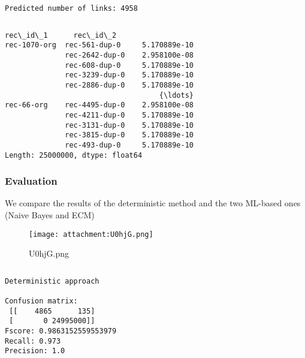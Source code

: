 \documentclass{article}
\begin{document}
    \begin{Verbatim}[commandchars=\\\{\}]

\end{Verbatim}

    \begin{Verbatim}[commandchars=\\\{\}]
Predicted number of links: 4958

    \end{Verbatim}

    \begin{Verbatim}[commandchars=\\\{\}]

\end{Verbatim}

    \begin{Verbatim}[commandchars=\\\{\}]
rec\_id\_1      rec\_id\_2      
rec-1070-org  rec-561-dup-0     5.170889e-10
              rec-2642-dup-0    2.958100e-08
              rec-608-dup-0     5.170889e-10
              rec-3239-dup-0    5.170889e-10
              rec-2886-dup-0    5.170889e-10
                                    {\ldots}     
rec-66-org    rec-4495-dup-0    2.958100e-08
              rec-4211-dup-0    5.170889e-10
              rec-3131-dup-0    5.170889e-10
              rec-3815-dup-0    5.170889e-10
              rec-493-dup-0     5.170889e-10
Length: 25000000, dtype: float64

    \end{Verbatim}

    \hypertarget{evaluation}{%
\subsubsection{Evaluation}\label{evaluation}}

We compare the results of the deterministic method and the two ML-based
ones (Naive Bayes and ECM)

    \begin{figure}
\centering
\texttt{[image: attachment:U0hjG.png]}
\caption{U0hjG.png}
\end{figure}

    \begin{Verbatim}[commandchars=\\\{\}]

\end{Verbatim}

    \begin{Verbatim}[commandchars=\\\{\}]
Deterministic approach 

Confusion matrix: 
 [[    4865      135]
 [       0 24995000]]
Fscore: 0.9863152559553979
Recall: 0.973
Precision: 1.0

    \end{Verbatim}
\end{document}

